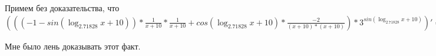 \documentclass[12pt,a4paper,fleqn]{article}
\theoremstyle{definition}
\begin{document}
Примем без доказательства, что
$((( -1  - sin(\log_{ 2.71828 }{ x  +  10 })) * \frac{ 1 }{ x  +  10 }
 * \frac{ 1 }{ x  +  10 }
 + cos(\log_{ 2.71828 }{ x  +  10 }) * \frac{ -2 }{( x  +  10 ) * ( x  +  10 )}
) * { 3 }^{sin(\log_{ 2.71828 }{ x  +  10 })})' = ((( 0  - cos(\log_{ 2.71828 }{ x  +  10 }) * \frac{ 1  +  0 }{\log_{ 2.71828 }{ 2.71828 } * ( x  +  10 )}
) * \frac{ 1 }{ x  +  10 }
 + ( -1  - sin(\log_{ 2.71828 }{ x  +  10 })) * \frac{ 0  * ( x  +  10 ) -  1  * ( 1  +  0 )}{( x  +  10 ) * ( x  +  10 )}
) * \frac{ 1 }{ x  +  10 }
 + ( -1  - sin(\log_{ 2.71828 }{ x  +  10 })) * \frac{ 1 }{ x  +  10 }
 * \frac{ 0  * ( x  +  10 ) -  1  * ( 1  +  0 )}{( x  +  10 ) * ( x  +  10 )}
 + ( -1  - sin(\log_{ 2.71828 }{ x  +  10 })) * \frac{ 1  +  0 }{\log_{ 2.71828 }{ 2.71828 } * ( x  +  10 )}
 * \frac{ -2 }{( x  +  10 ) * ( x  +  10 )}
 + cos(\log_{ 2.71828 }{ x  +  10 }) * \frac{ 0  * ( x  +  10 ) * ( x  +  10 ) -  -2  * (( 1  +  0 ) * ( x  +  10 ) + ( x  +  10 ) * ( 1  +  0 ))}{( x  +  10 ) * ( x  +  10 ) * ( x  +  10 ) * ( x  +  10 )}
) * { 3 }^{sin(\log_{ 2.71828 }{ x  +  10 })} + (( -1  - sin(\log_{ 2.71828 }{ x  +  10 })) * \frac{ 1 }{ x  +  10 }
 * \frac{ 1 }{ x  +  10 }
 + cos(\log_{ 2.71828 }{ x  +  10 }) * \frac{ -2 }{( x  +  10 ) * ( x  +  10 )}
) * \log_{ 2.71828 }{ 3 } * cos(\log_{ 2.71828 }{ x  +  10 }) * \frac{ 1  +  0 }{\log_{ 2.71828 }{ 2.71828 } * ( x  +  10 )}
 * { 3 }^{sin(\log_{ 2.71828 }{ x  +  10 })}$

Мне было лень доказывать этот факт.
\end{document}
